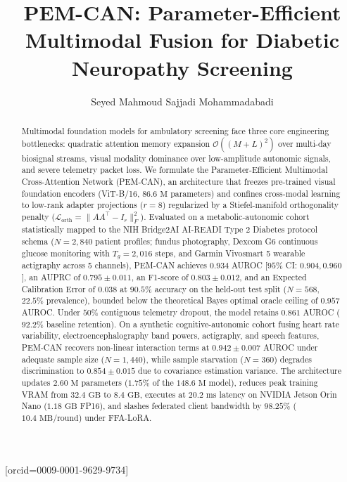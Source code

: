\documentclass[a4paper,fleqn]{cas-dc}
\begin{document}
\let\WriteBookmarks\relax


\title[mode = title]{PEM-CAN: Parameter-Efficient Multimodal Fusion for Diabetic Neuropathy Screening}

\author[1]{Seyed Mahmoud Sajjadi Mohammadabadi}[orcid=0009-0001-9629-9734]
\cormark[1]



\begin{abstract}
Multimodal foundation models for ambulatory screening face three core engineering bottlenecks: quadratic attention memory expansion $\mathcal{O}((M+L)^2)$ over multi-day biosignal streams, visual modality dominance over low-amplitude autonomic signals, and severe telemetry packet loss. We formulate the Parameter-Efficient Multimodal Cross-Attention Network (PEM-CAN), an architecture that freezes pre-trained visual foundation encoders (ViT-B/16, $86.6\text{ M}$ parameters) and confines cross-modal learning to low-rank adapter projections ($r=8$) regularized by a Stiefel-manifold orthogonality penalty ($\mathcal{L}_{\text{orth}} = \|AA^\top - I_r\|_F^2$). Evaluated on a metabolic-autonomic cohort statistically mapped to the NIH Bridge2AI AI-READI Type 2 Diabetes protocol schema ($N=2{,}840$ patient profiles; fundus photography, Dexcom G6 continuous glucose monitoring with $T_g=2{,}016$ steps, and Garmin Vivosmart 5 wearable actigraphy across 5 channels), PEM-CAN achieves $0.934$ AUROC [$95\%$ CI: $0.904, 0.960$], an AUPRC of $0.795 \pm 0.011$, an F1-score of $0.803 \pm 0.012$, and an Expected Calibration Error of $0.038$ at $90.5\%$ accuracy on the held-out test split ($N=568$, $22.5\%$ prevalence), bounded below the theoretical Bayes optimal oracle ceiling of $0.957$ AUROC. Under $50\%$ contiguous telemetry dropout, the model retains $0.861$ AUROC ($92.2\%$ baseline retention). On a synthetic cognitive-autonomic cohort fusing heart rate variability, electroencephalography band powers, actigraphy, and speech features, PEM-CAN recovers non-linear interaction terms at $0.942 \pm 0.007$ AUROC under adequate sample size ($N=1{,}440$), while sample starvation ($N=360$) degrades discrimination to $0.854 \pm 0.015$ due to covariance estimation variance. The architecture updates $2.60\text{ M}$ parameters ($1.75\%$ of the $148.6\text{ M}$ model), reduces peak training VRAM from $32.4\text{ GB}$ to $8.4\text{ GB}$, executes at $20.2\text{ ms}$ latency on NVIDIA Jetson Orin Nano ($1.18\text{ GB}$ FP16), and slashes federated client bandwidth by $98.25\%$ ($10.4\text{ MB/round}$) under FFA-LoRA.
\end{abstract}
\end{document}
